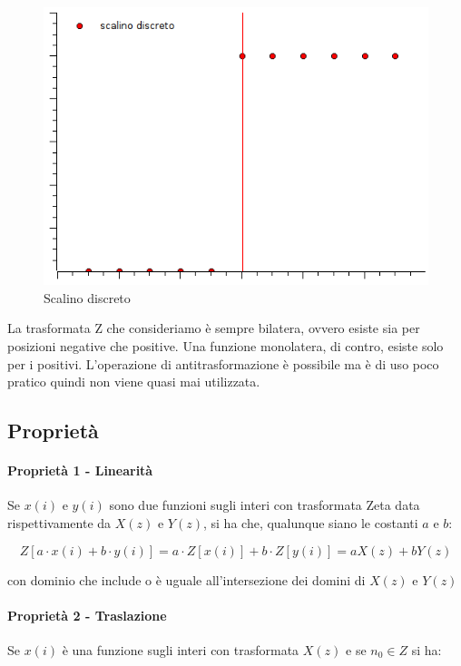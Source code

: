 \begin{figure}[htbp]
  \centering
  \includegraphics[scale=0.5]{img/scalinodiscreto.png}
  \caption{Scalino discreto\label{fig:scalinodiscreto}}
\end{figure}


La trasformata Z che consideriamo è sempre bilatera, ovvero esiste sia per posizioni negative che positive. Una funzione monolatera, di contro, esiste solo per i positivi.\newline
L'operazione di antitrasformazione è possibile ma è di uso poco pratico quindi non viene quasi mai utilizzata.
\subsection{Proprietà}
\paragraph{Proprietà 1 - Linearità} Se $x(i)$ e $y(i)$ sono due funzioni sugli interi con trasformata Zeta data rispettivamente da $X(z)$ e $Y(z)$, si ha che, qualunque siano le costanti $a$ e $b$:

  \[ Z[a\cdot x(i)+b\cdot y(i)]=a \cdot Z[x(i)] + b \cdot Z[y(i)]=aX(z)+bY(z) \]
  
con dominio che include o è uguale all'intersezione dei domini di $X(z)$ e $Y(z)$
\paragraph{Proprietà 2 - Traslazione} Se $x(i)$ è una funzione sugli interi con trasformata $X(z)$ e se $n_0 \in Z$ si ha:

